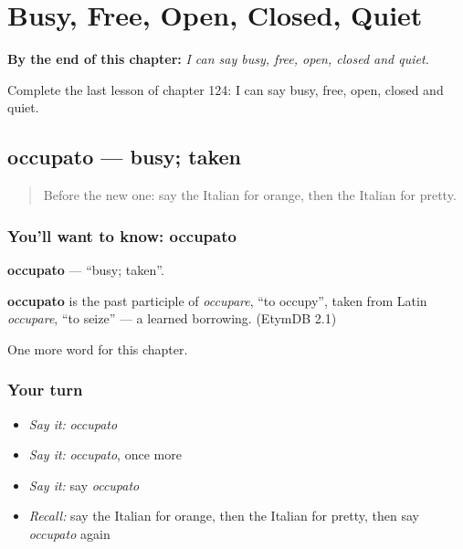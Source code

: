 
\chapter{Busy, Free, Open, Closed, Quiet}
\label{ch:it-busy-free-open-closed-quiet}

\begin{chapteropening}
\textbf{By the end of this chapter:} \emph{I can say busy, free, open, closed and quiet.}

Complete the last lesson of chapter 124: I can say busy, free, open, closed and quiet.
\end{chapteropening}

\section[occupato]{occupato — busy; taken}

\label{lesson:IT-C124-occupato}



\begin{quote}
Before the new one: say the Italian for orange, then the Italian for pretty.
\end{quote}

\subsection*{You'll want to know: occupato}
\textbf{occupato} — \textquotedblleft{}busy; taken\textquotedblright{}.

\begin{cousinweb}
\textbf{occupato} is the past participle of \emph{occupare}, \textquotedblleft{}to occupy\textquotedblright{}, taken from Latin \emph{occupare}, \textquotedblleft{}to seize\textquotedblright{} — a learned borrowing. (EtymDB 2.1)
\end{cousinweb}

\begin{grammarlens}[title={What you've built}]
One more word for this chapter.
\end{grammarlens}

\subsection*{Your turn}
\begin{itemize}
\raggedright
  \item \emph{Say it:} \emph{occupato}
  \item \emph{Say it:} \emph{occupato}, once more
  \item \emph{Say it:} say \emph{occupato}
  \item \emph{Recall:} say the Italian for orange, then the Italian for pretty, then say \emph{occupato} again
\end{itemize}

